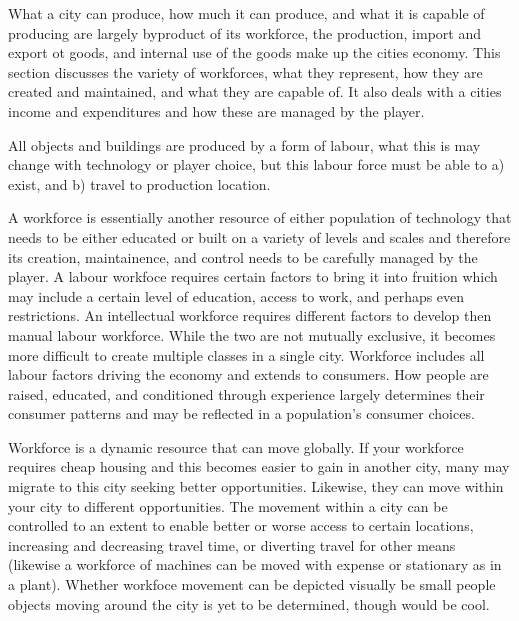 
What a city can produce, how much it can produce, and what it is capable of producing are largely byproduct of its workforce, the production, import and export ot goods, and internal use of the goods make up the cities economy. This section discusses the variety of workforces, what they represent, how they are created and maintained, and what they are capable of. It also deals with a cities income and expenditures and how these are managed by the player.  

All objects and buildings are produced by a form of labour, what this is may change with technology or player choice, but this labour force must be able to a) exist, and b) travel to production location.

A workforce is essentially another resource of either population of technology that needs to be either educated or built on a variety of levels and scales and therefore its creation, maintainence, and control needs to be carefully managed by the player. A labour workfoce requires certain factors to bring it into fruition which may include a certain level of education, access to work, and perhaps even restrictions. An intellectual workforce requires different factors to develop then manual labour workforce. While the two are not mutually exclusive, it becomes more difficult to create multiple classes in a single city. Workforce includes all labour factors driving the economy and extends to consumers. How people are raised, educated, and conditioned through experience largely determines their consumer patterns and may be reflected in a population's consumer choices.

Workforce is a dynamic resource that can move globally. If your workforce requires cheap housing and this becomes easier to gain in another city, many may migrate to this city seeking better opportunities. Likewise, they can move within your city to different opportunities. The movement within a city can be controlled to an extent to enable better or worse access to certain locations, increasing and decreasing travel time, or diverting travel for other means (likewise a workforce of machines can be moved with expense or stationary as in a plant). Whether workfoce movement can be depicted visually be small people objects moving around the city is yet to be determined, though would be cool. 

